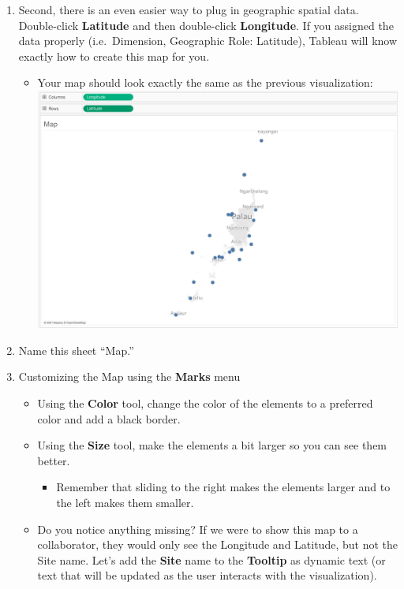\documentclass[
]{book}
\providecommand{\tightlist}{%
  \setlength{\itemsep}{0pt}\setlength{\parskip}{0pt}}
\begin{document}
\begin{enumerate}
\def\labelenumi{\arabic{enumi}.}
\setcounter{enumi}{3}
\tightlist
\item
  Second, there is an even easier way to plug in geographic spatial data. Double-click \textbf{Latitude} and then double-click \textbf{Longitude}. If you assigned the data properly (i.e.~Dimension, Geographic Role: Latitude), Tableau will know exactly how to create this map for you.

  \begin{itemize}
  \tightlist
  \item
    Your map should look exactly the same as the previous visualization:
    \includegraphics{images/M3S2_map-1.png}
  \end{itemize}
\item
  Name this sheet ``Map.''
\item
  Customizing the Map using the \textbf{Marks} menu

  \begin{itemize}
  \tightlist
  \item
    Using the \textbf{Color} tool, change the color of the elements to a preferred color and add a black border.
  \item
    Using the \textbf{Size} tool, make the elements a bit larger so you can see them better.

    \begin{itemize}
    \tightlist
    \item
      Remember that sliding to the right makes the elements larger and to the left makes them smaller.
    \end{itemize}
  \item
    Do you notice anything missing? If we were to show this map to a collaborator, they would only see the Longitude and Latitude, but not the Site name. Let's add the \textbf{Site} name to the \textbf{Tooltip} as dynamic text (or text that will be updated as the user interacts with the visualization).


\end{itemize}
\end{enumerate}
\end{document}
